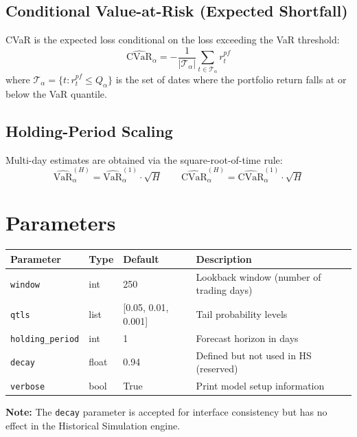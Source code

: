 \documentclass[11pt, a4paper]{article}
\begin{document}
\subsection{Conditional Value-at-Risk (Expected Shortfall)}

CVaR is the expected loss conditional on the loss exceeding the VaR
threshold:
\begin{equation}
\widehat{\text{CVaR}}_\alpha
= -\frac{1}{|\mathcal{T}_\alpha|} \sum_{t \in \mathcal{T}_\alpha} r_t^{pf}
\end{equation}
where $\mathcal{T}_\alpha = \{t : r_t^{pf} \leq Q_\alpha\}$
is the set of dates where the portfolio return falls at or below the
VaR quantile.

\subsection{Holding-Period Scaling}

Multi-day estimates are obtained via the square-root-of-time rule:
\begin{equation}
\widehat{\text{VaR}}_\alpha^{(H)} = \widehat{\text{VaR}}_\alpha^{(1)} \cdot \sqrt{H}
\qquad
\widehat{\text{CVaR}}_\alpha^{(H)} = \widehat{\text{CVaR}}_\alpha^{(1)} \cdot \sqrt{H}
\end{equation}

\section{Parameters}

\begin{tabular}{llll}
\toprule
Parameter & Type & Default & Description \\
\midrule
\texttt{window} & int & 250 & Lookback window (number of trading days) \\
\texttt{qtls}   & list & [0.05, 0.01, 0.001] & Tail probability levels \\
\texttt{holding\_period} & int & 1 & Forecast horizon in days \\
\texttt{decay}  & float & 0.94 & Defined but not used in HS (reserved) \\
\texttt{verbose} & bool & True & Print model setup information \\
\bottomrule
\end{tabular}

\medskip
\textbf{Note:} The \texttt{decay} parameter is accepted for interface
consistency but has no effect in the Historical Simulation engine.
\end{document}
